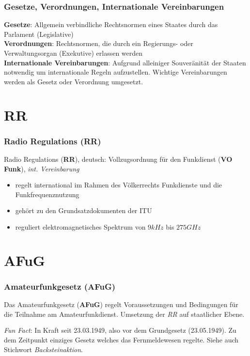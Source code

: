 \begin{frame}
  \frametitle{Gesetze, Verordnungen, Internationale Vereinbarungen}

  \textbf{Gesetze}: Allgemein verbindliche Rechtsnormen eines Staates durch
  das Parlament (Legislative) \\[1em]

  \textbf{Verordnungen}: Rechtsnormen, die durch ein Regierungs- oder
  Verwaltungsorgan (Exekutive) erlassen werden \\[1em]

  \textbf{Internationale Vereinbarungen}: Aufgrund alleiniger Souveränität der
  Staaten notwendig um internationale Regeln aufzustellen. Wichtige Vereinbarungen
  werden als Gesetz oder Verordnung umgesetzt.

\end{frame}


\section{RR}

\begin{frame}
  \frametitle{Radio Regulations (RR)}

  Radio Regulations (\textbf{RR}), deutsch: Vollzugsordnung für den Funkdienst
  (\textbf{VO Funk}), \emph{int. Vereinbarung}

  \begin{itemize}
    \item regelt international im Rahmen des Völkerrechts Funkdienste und
      die Funkfrequenznutzung
    \item gehört zu den Grundsatzdokumenten der ITU
    \item reguliert elektromagnetisches Spektrum von $9kHz$ bis $275GHz$
  \end{itemize}

\end{frame}

\section{AFuG}

\begin{frame}
  \frametitle{Amateurfunkgesetz (AFuG)}

  Das Amateurfunkgesetz (\textbf{AFuG}) regelt Voraussetzungen und Bedingungen
  für die Teilnahme am Amateurfunkdienst. Umsetzung der \emph{RR} auf
  staatlicher Ebene.

  \vspace{2em}
  \emph{Fun Fact}: In Kraft seit 23.03.1949, also vor dem Grundgesetz
  (23.05.1949). Zu dem Zeitpunkt einziges Gesetz welches das Fernmeldewesen
  regelte. Siehe auch Stichwort \emph{Backsteinaktion}.

\end{frame}

